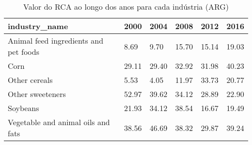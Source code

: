 \begin{table}
\centering
\caption{Valor do RCA ao longo dos anos para cada indústria (ARG)}
\begin{tabular}{p{6cm}p{1.5cm}p{1.5cm}p{1.5cm}p{1.5cm}p{1.5cm}}
\toprule
                        industry\_name &  2000 &  2004 &  2008 &  2012 &  2016 \\
\midrule
Animal feed ingredients and pet foods &  8.69 &  9.70 & 15.70 & 15.14 & 19.03 \\
                                 Corn & 29.11 & 29.40 & 32.92 & 31.98 & 40.23 \\
                        Other cereals &  5.53 &  4.05 & 11.97 & 33.73 & 20.77 \\
                     Other sweeteners & 52.97 & 39.62 & 34.12 & 28.89 & 22.90 \\
                             Soybeans & 21.93 & 34.12 & 38.54 & 16.67 & 19.49 \\
   Vegetable and animal oils and fats & 38.56 & 46.69 & 38.32 & 29.87 & 39.24 \\
\bottomrule
\end{tabular}
\end{table}
